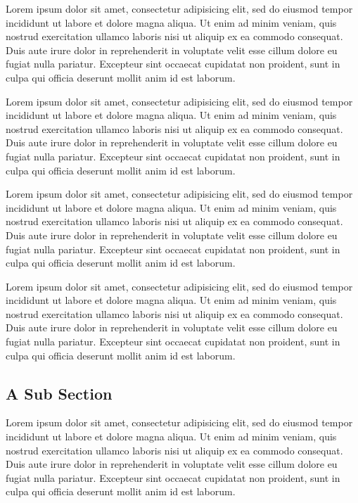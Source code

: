 \documentclass[a0,landscape]{a0poster}
\begin{document}
Lorem ipsum dolor sit amet, consectetur adipisicing elit, sed do eiusmod
tempor incididunt ut labore et dolore magna aliqua. Ut enim ad minim
veniam, quis nostrud exercitation ullamco laboris nisi ut aliquip ex ea
commodo consequat. Duis aute irure dolor in reprehenderit in voluptate
velit esse cillum dolore eu fugiat nulla pariatur. Excepteur sint occaecat
cupidatat non proident, sunt in culpa qui officia deserunt mollit anim
id est laborum.

Lorem ipsum dolor sit amet, consectetur adipisicing elit, sed do eiusmod
tempor incididunt ut labore et dolore magna aliqua. Ut enim ad minim
veniam, quis nostrud exercitation ullamco laboris nisi ut aliquip ex ea
commodo consequat. Duis aute irure dolor in reprehenderit in voluptate
velit esse cillum dolore eu fugiat nulla pariatur. Excepteur sint occaecat
cupidatat non proident, sunt in culpa qui officia deserunt mollit anim
id est laborum.

Lorem ipsum dolor sit amet, consectetur adipisicing elit, sed do eiusmod
tempor incididunt ut labore et dolore magna aliqua. Ut enim ad minim
veniam, quis nostrud exercitation ullamco laboris nisi ut aliquip ex ea
commodo consequat. Duis aute irure dolor in reprehenderit in voluptate
velit esse cillum dolore eu fugiat nulla pariatur. Excepteur sint occaecat
cupidatat non proident, sunt in culpa qui officia deserunt mollit anim
id est laborum.

Lorem ipsum dolor sit amet, consectetur adipisicing elit, sed do eiusmod
tempor incididunt ut labore et dolore magna aliqua. Ut enim ad minim
veniam, quis nostrud exercitation ullamco laboris nisi ut aliquip ex ea
commodo consequat. Duis aute irure dolor in reprehenderit in voluptate
velit esse cillum dolore eu fugiat nulla pariatur. Excepteur sint occaecat
cupidatat non proident, sunt in culpa qui officia deserunt mollit anim
id est laborum.

\subsection{A Sub Section}

Lorem ipsum dolor sit amet, consectetur adipisicing elit, sed do eiusmod
tempor incididunt ut labore et dolore magna aliqua. Ut enim ad minim
veniam, quis nostrud exercitation ullamco laboris nisi ut aliquip ex ea
commodo consequat. Duis aute irure dolor in reprehenderit in voluptate
velit esse cillum dolore eu fugiat nulla pariatur. Excepteur sint occaecat
cupidatat non proident, sunt in culpa qui officia deserunt mollit anim
id est laborum.
\end{document}
